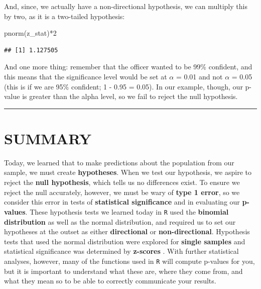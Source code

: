 \documentclass[
]{book}
\newenvironment{Shaded}{\begin{snugshade}}{\end{snugshade}}
\newcommand{\DecValTok}[1]{\textcolor[rgb]{0.00,0.00,0.81}{#1}}
\newcommand{\FunctionTok}[1]{\textcolor[rgb]{0.00,0.00,0.00}{#1}}
\newcommand{\NormalTok}[1]{#1}
\newcommand{\SpecialCharTok}[1]{\textcolor[rgb]{0.00,0.00,0.00}{#1}}
\begin{document}
And, since, we actually have a non-directional hypothesis, we can multiply this by two, as it is a two-tailed hypothesis:

\begin{Shaded}
\begin{Highlighting}[]
\FunctionTok{pnorm}\NormalTok{(z\_stat)}\SpecialCharTok{*}\DecValTok{2}
\end{Highlighting}
\end{Shaded}

\begin{verbatim}
## [1] 1.127505
\end{verbatim}

And one more thing: remember that the officer wanted to be 99\% confident, and this means that the significance level would be set at \(\alpha\) = 0.01 and not \(\alpha\) = 0.05 (this is if we are 95\% confident; 1 - 0.95 = 0.05). In our example, though, our p-value is greater than the alpha level, so we fail to reject the null hypothesis.

\begin{center}\rule{0.5\linewidth}{0.5pt}\end{center}

\hypertarget{summary-5}{%
\section{SUMMARY}\label{summary-5}}

Today, we learned that to make predictions about the population from our sample, we must create \textbf{hypotheses}. When we test our hypothesis, we aspire to reject the \textbf{null hypothesis}, which tells us no differences exist. To ensure we reject the null accurately, however, we must be wary of \textbf{type 1 error}, so we consider this error in tests of \textbf{statistical significance} and in evaluating our \textbf{p-values}. These hypothesis tests we learned today in \texttt{R} used the \textbf{binomial distribution} as well as the normal distribution, and required us to set our hypotheses at the outset as either \textbf{directional} or \textbf{non-directional}. Hypothesis tests that used the normal distribution were explored for \textbf{single samples} and statistical significance was determined by \textbf{z-scores} . With further statistical analyses, however, many of the functions used in \texttt{R} will compute p-values for you, but it is important to understand what these are, where they come from, and what they mean so to be able to correctly communicate your results.
\end{document}
